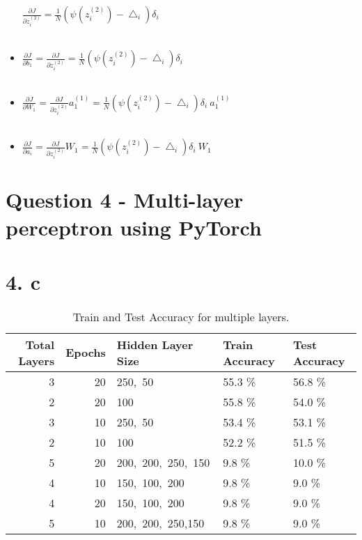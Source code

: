\documentclass[
	12pt, %
]{fphw}
\begin{document}
\begin{itemize}
$\frac {\partial J}{\partial z_{i}^{(2)}} = \frac{1}{N} (\psi(z_{i}^{(2)}) - \bigtriangleup_i) \delta_i$ \\ \\

\item $\frac {\partial J}{\partial b_1} = \frac {\partial J}{\partial z_{i}^{(2)}} = \frac{1}{N} (\psi(z_{i}^{(2)}) - \bigtriangleup_i) \delta_i$ \\ \\

\item $\frac {\partial J}{\partial W_1} = \frac {\partial J}{\partial z_{i}^{(2)}} a_{1}^{(1)} = \frac{1}{N} (\psi(z_{i}^{(2)}) - \bigtriangleup_i) \delta_i \ a_{1}^{(1)}$ \\ \\

\item $\frac {\partial J}{\partial a_i} = \frac {\partial J}{\partial z_{i}^{(2)}} W_1 = \frac{1}{N} (\psi(z_{i}^{(2)}) - \bigtriangleup_i) \delta_i \ W_1$

\end{itemize}

\newpage

\section*{Question 4 - Multi-layer perceptron using PyTorch}
\section* {4. c}

\begin{table}[ht]
\begin{center}
\caption{Train and Test Accuracy for multiple layers.}
\begin{tabular}{rrlll}
\toprule
 Total Layers &  Epochs & Hidden Layer Size & Train Accuracy & Test Accuracy \\
\midrule
            3 &      20 &            250,\ 50 &         55.3 \% &        56.8 \% \\
            2 &      20 &               100 &         55.8 \% &        54.0 \% \\
            3 &      10 &            250,\ 50 &         53.4 \% &        53.1 \% \\
            2 &      10 &               100 &         52.2 \% &        51.5 \% \\
            5 &      20 &   200,\ 200,\ 250,\ 150 &          9.8 \% &        10.0 \% \\
            4 &      10 &       150,\ 100,\ 200 &          9.8 \% &         9.0 \% \\
            4 &      20 &       150,\ 100,\ 200 &          9.8 \% &         9.0 \% \\
            5 &      10 &   200,\ 200,\ 250,150 &          9.8 \% &         9.0 \% \\
\bottomrule
\end{tabular}
\end{center}
\end{table}
\end{document}
